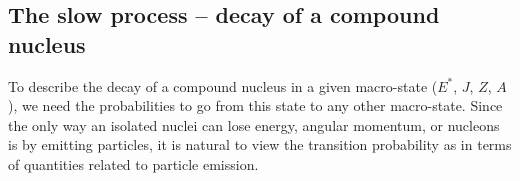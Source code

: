 \subsection{The slow process -- decay of a compound nucleus}
To describe the decay of a compound nucleus in a given macro-state ($E^*$, $J$, $Z$, $A$), we need the probabilities to go from this state to any other macro-state. Since the only way an isolated nuclei can lose energy, angular momentum, or nucleons is by emitting particles, it is natural to view the transition probability as in terms of quantities related to particle emission.

